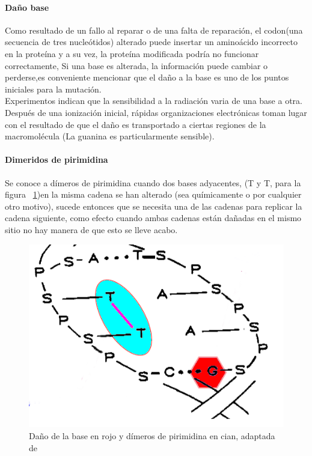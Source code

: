 \paragraph{Daño base}

Como resultado de un fallo al reparar o de una falta de reparación, el codon(una secuencia de tres nucleótidos) alterado puede insertar un aminoácido incorrecto en la proteína y a su vez, la proteína modificada podría no funcionar correctamente, Si una base es alterada, la información puede cambiar o perderse,es conveniente mencionar que el daño a la base es uno de los puntos iniciales para la mutación. \\
Experimentos indican que la sensibilidad a la radiación varia de una base a otra. Después de una ionización inicial, rápidas organizaciones electrónicas toman lugar con el resultado de que el daño es transportado a ciertas regiones de la macromolécula (La guanina es particularmente sensible)\cite{Thormod}.

\paragraph{Dimeridos de pirimidina}

Se conoce a dímeros de pirimidina cuando dos bases adyacentes, (T y T, para la figura ~\ref{fig:dbdi})en la misma cadena se han alterado (sea químicamente o por cualquier otro motivo),  sucede entonces  que se necesita una de las cadenas para replicar la cadena siguiente, como efecto cuando ambas cadenas están dañadas en el mismo sitio no hay manera de que esto se lleve acabo.

\begin{figure}[htbp]
    \centering
    \includegraphics[width=0.5\linewidth]{./Figures/base-piri.png}
    \caption[Esquema Daño base y Dimeridos]{ Daño de la base en rojo y dímeros de pirimidina en cian, adaptada de \cite{Thormod}}
    \label{fig:dbdi}
\end{figure}

